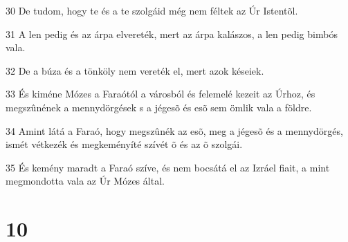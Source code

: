 \par 30 De tudom, hogy te és a te szolgáid még nem féltek az Úr Istentõl.
\par 31 A len pedig és az árpa elvereték, mert az árpa kalászos, a len pedig bimbós vala.
\par 32 De a búza és a tönköly nem vereték el, mert azok késeiek.
\par 33 És kiméne Mózes a Faraótól a városból és felemelé kezeit az Úrhoz, és megszûnének a mennydörgések s a jégesõ és esõ sem ömlik vala a földre.
\par 34 Amint látá a Faraó, hogy megszûnék az esõ, meg a jégesõ és a mennydörgés, ismét vétkezék és megkeményíté szívét õ és az õ szolgái.
\par 35 És kemény maradt a Faraó szíve, és nem bocsátá el az Izráel fiait, a mint megmondotta vala az Úr Mózes által.

\chapter{10}

